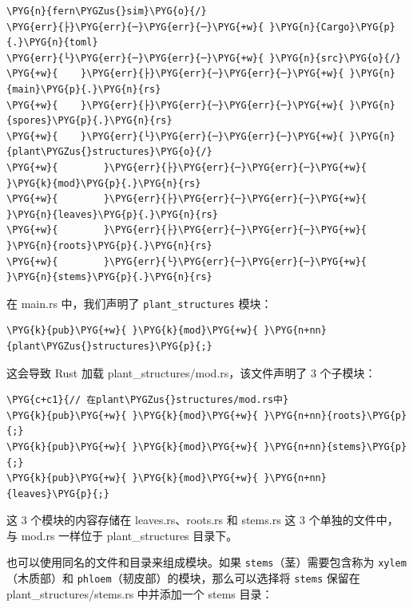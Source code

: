 \begin{Verbatim}[commandchars=\\\{\},breaklines=true,breakanywhere=true,fontsize=\codefont,xleftmargin=17bp]
\PYG{n}{fern\PYGZus{}sim}\PYG{o}{/}
\PYG{err}{├}\PYG{err}{─}\PYG{err}{─}\PYG{+w}{ }\PYG{n}{Cargo}\PYG{p}{.}\PYG{n}{toml}
\PYG{err}{└}\PYG{err}{─}\PYG{err}{─}\PYG{+w}{ }\PYG{n}{src}\PYG{o}{/}
\PYG{+w}{    }\PYG{err}{├}\PYG{err}{─}\PYG{err}{─}\PYG{+w}{ }\PYG{n}{main}\PYG{p}{.}\PYG{n}{rs}
\PYG{+w}{    }\PYG{err}{├}\PYG{err}{─}\PYG{err}{─}\PYG{+w}{ }\PYG{n}{spores}\PYG{p}{.}\PYG{n}{rs}
\PYG{+w}{    }\PYG{err}{└}\PYG{err}{─}\PYG{err}{─}\PYG{+w}{ }\PYG{n}{plant\PYGZus{}structures}\PYG{o}{/}
\PYG{+w}{        }\PYG{err}{├}\PYG{err}{─}\PYG{err}{─}\PYG{+w}{ }\PYG{k}{mod}\PYG{p}{.}\PYG{n}{rs}
\PYG{+w}{        }\PYG{err}{├}\PYG{err}{─}\PYG{err}{─}\PYG{+w}{ }\PYG{n}{leaves}\PYG{p}{.}\PYG{n}{rs}
\PYG{+w}{        }\PYG{err}{├}\PYG{err}{─}\PYG{err}{─}\PYG{+w}{ }\PYG{n}{roots}\PYG{p}{.}\PYG{n}{rs}
\PYG{+w}{        }\PYG{err}{└}\PYG{err}{─}\PYG{err}{─}\PYG{+w}{ }\PYG{n}{stems}\PYG{p}{.}\PYG{n}{rs}
\end{Verbatim}

在 main.rs 中，我们声明了 \texttt{plant\_structures} 模块：

\begin{Verbatim}[commandchars=\\\{\},breaklines=true,breakanywhere=true,fontsize=\codefont,xleftmargin=17bp]
\PYG{k}{pub}\PYG{+w}{ }\PYG{k}{mod}\PYG{+w}{ }\PYG{n+nn}{plant\PYGZus{}structures}\PYG{p}{;}
\end{Verbatim}

这会导致 Rust 加载 plant\_structures/\allowbreak{}mod.rs，该文件声明了 3 个子模块：

\begin{Verbatim}[commandchars=\\\{\},breaklines=true,breakanywhere=true,fontsize=\codefont,xleftmargin=17bp]
\PYG{c+c1}{// 在plant\PYGZus{}structures/mod.rs中}
\PYG{k}{pub}\PYG{+w}{ }\PYG{k}{mod}\PYG{+w}{ }\PYG{n+nn}{roots}\PYG{p}{;}
\PYG{k}{pub}\PYG{+w}{ }\PYG{k}{mod}\PYG{+w}{ }\PYG{n+nn}{stems}\PYG{p}{;}
\PYG{k}{pub}\PYG{+w}{ }\PYG{k}{mod}\PYG{+w}{ }\PYG{n+nn}{leaves}\PYG{p}{;}
\end{Verbatim}

这 3 个模块的内容存储在 leaves.rs、roots.rs 和 stems.rs 这 3 个单独的文件中，与 mod.rs 一样位于 plant\_structures 目录下。

也可以使用同名的文件和目录来组成模块。如果 \texttt{stems}（茎）需要包含称为 \texttt{xylem}（木质部）和 \texttt{phloem}（韧皮部）的模块，那么可以选择将 \texttt{stems} 保留在 plant\_structures/\allowbreak{}stems.rs 中并添加一个 stems 目录：

